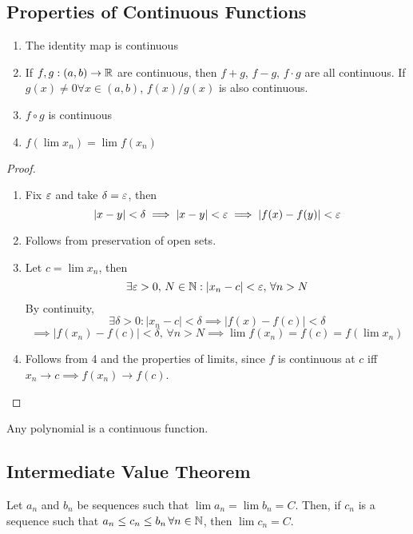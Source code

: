 \documentclass[a4paper,10pt]{article}
\begin{document}
\subsection{Properties of Continuous Functions}

\begin{enumerate}
	\item The identity map is continuous
	\item
		If $f,g:(a,b) \to \mathbb{R}$ are continuous, then $f+g$, $f-g$,
		$f\cdot g$ are all continuous. If $g(x) \neq 0 \forall x
		\in (a,b)$, $f(x)/g(x)$ is also continuous.
	\item $f \circ g$ is continuous
	\item $f(\lim x_n) = \lim f(x_n)$
\end{enumerate}

\begin{proof}
	\begin{enumerate}
		\item
			Fix $\varepsilon$ and take $\delta = \varepsilon$, then
			\[ |x-y| < \delta \implies |x-y| < \varepsilon \implies |f(x)-f(y)| < \varepsilon \]

		\item Follows from preservation of open sets.

		\item
			Let $c = \lim x_n$, then
			\[ \exists \varepsilon > 0, \, N \in \mathbb{N} : |x_n - c| < \varepsilon, \, \forall n > N \]
			By continuity,
			\[ \exists \delta > 0 : |x_n -c| < \delta \implies |f(x)-f(c)| < \delta \]
			\[
				\implies |f(x_n) - f(c)| < \delta, \, \forall n > N
				\implies \lim f(x_n) = f(c) = f(\lim x_n)
			\]

		\item
			Follows from 4 and the properties of limits, since $f$ is continuous at $c$ iff
			$x_n \to c \implies f(x_n) \to f(c)$.
	\end{enumerate}
\end{proof}

\begin{cor}
	Any polynomial is a continuous function.
\end{cor}

\subsection{Intermediate Value Theorem}

\begin{thm}[Sandwich]
	Let $a_n$ and $b_n$ be sequences such that $\lim a_n = \lim b_n
	= C$. Then, if $c_n$ is a sequence such that $a_n \leq c_n \leq
	b_n \, \forall n \in \mathbb{N}$, then $\lim c_n = C$.
\end{thm}
\end{document}
